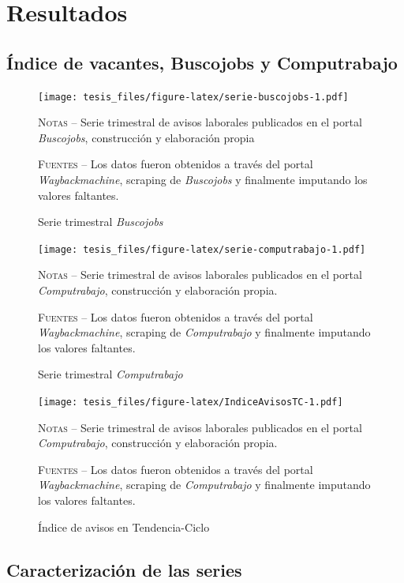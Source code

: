 \documentclass[12pt,oneside]{reedthesis}
\begin{document}
\hypertarget{resultados}{%
\section{Resultados}\label{resultados}}

\hypertarget{uxedndice-de-vacantes-buscojobs-y-computrabajo}{%
\subsection{Índice de vacantes, Buscojobs y Computrabajo}\label{uxedndice-de-vacantes-buscojobs-y-computrabajo}}
\begin{figure}
\texttt{[image: tesis\_files/figure-latex/serie-buscojobs-1.pdf]}
\caption{Serie trimestral \textit{Buscojobs}}\label{fig:serie-buscojobs}\textsc{}

\footnotesize\textsc{Notas} -- Serie trimestral de avisos laborales publicados en el portal \textit{Buscojobs}, construcción y elaboración propia

\textsc{Fuentes} -- Los datos fueron obtenidos a través del portal \textit{Waybackmachine}, scraping de \textit{Buscojobs} y finalmente imputando los valores faltantes.
\end{figure}
\begin{figure}
\texttt{[image: tesis\_files/figure-latex/serie-computrabajo-1.pdf]}
\caption{Serie trimestral \textit{Computrabajo}}\label{fig:serie-computrabajo}\textsc{}

\footnotesize\textsc{Notas} -- Serie trimestral de avisos laborales publicados en el portal \textit{Computrabajo}, construcción y elaboración propia.

\textsc{Fuentes} -- Los datos fueron obtenidos a través del portal \textit{Waybackmachine}, scraping de \textit{Computrabajo} y finalmente imputando los valores faltantes.
\end{figure}
\begin{figure}
\texttt{[image: tesis\_files/figure-latex/IndiceAvisosTC-1.pdf]}
\caption{Índice de avisos en Tendencia-Ciclo}\label{fig:IndiceAvisosTC}\textsc{}

\footnotesize\textsc{Notas} -- Serie trimestral de avisos laborales publicados en el portal \textit{Computrabajo}, construcción y elaboración propia.

\textsc{Fuentes} -- Los datos fueron obtenidos a través del portal \textit{Waybackmachine}, scraping de \textit{Computrabajo} y finalmente imputando los valores faltantes.
\end{figure}
\hypertarget{caracterizaciuxf3n-de-las-series}{%
\subsection{Caracterización de las series}\label{caracterizaciuxf3n-de-las-series}}
\end{document}
